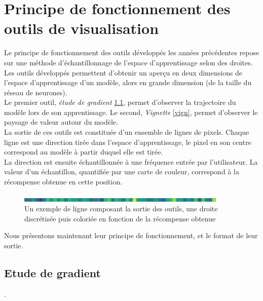 \documentclass[12pt]{article}
\begin{document}
\newpage
\section{Principe de fonctionnement des outils de visualisation}

Le principe de fonctionnement des outils développés les années précédentes repose sur une méthode d’échantillonnage de l’espace d’apprentissage selon des droites. \\

Les outils développés permettent d'obtenir un aperçu en deux dimensions de l'espace d'apprentissage d'un modèle, alors en grande dimension (de la taille du réseau de neurones). \\

Le premier outil, \emph{étude de gradient} \ref{gradient}, permet d'observer la trajectoire du modèle lors de son apprentissage. Le second, \emph{Vignette} \ref{vign}, permet d'observer le paysage de valeur autour du modèle. \\

La sortie de ces outils est constituée d’un ensemble de lignes de pixels. Chaque ligne est une direction tirée dans l’espace d’apprentissage, le pixel en son centre correspond au modèle à partir duquel elle est tirée. \\

La direction est ensuite échantillonnée à une fréquence entrée par l’utilisateur. La valeur d'un échantillon, quantifiée par une carte de couleur, correspond à la récompense obtenue en cette position. \\

\begin{figure}[htp]
    \centering
    \includegraphics[width=10cm]{Images/Ligne}
    \caption{Un exemple de ligne composant la sortie des outils, une droite discrétisée puis coloriée en fonction de la récompense obtenue}
    \label{fig:ligne1}
\end{figure}

Nous présentons maintenant leur principe de fonctionnement, et le format de leur sortie. \\

\subsection{Etude de gradient} \label{gradient}.
\end{document}
